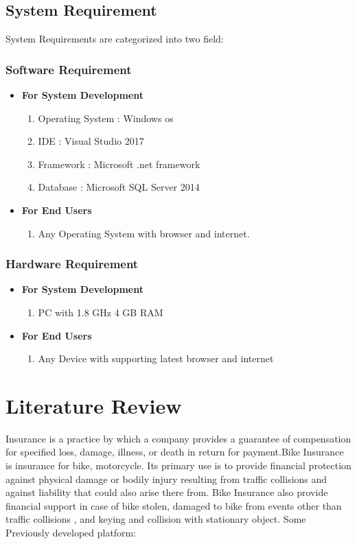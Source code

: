 \newpage
\section{System Requirement}
System Requirements are categorized  into two field:
\subsection{Software Requirement}
\begin{itemize}

\item{}\textbf{For System Development}
 \begin{enumerate}
 \item Operating System : Windows \acs{os}
 \item IDE : Visual Studio 2017
 \item Framework : Microsoft .net framework
 \item Database : Microsoft SQL Server 2014
 \end{enumerate}

\item \textbf{For End Users} 
\begin{enumerate}
\item Any Operating System with browser and internet.
\end{enumerate}

\end{itemize}

\subsection{Hardware Requirement}
\begin{itemize}
\item \textbf{For System  Development}
\begin{enumerate}
\item PC with 1.8 GHz 4 GB RAM
\end{enumerate}
\item \textbf{For End Users}
\begin{enumerate}
\item Any Device with supporting latest browser and internet
\end{enumerate}
\end{itemize}


\chapter{Literature Review}
Insurance is a practice by which a company provides a guarantee of compensation for specified loss, damage, illness, or death in return for payment.Bike Insurance is insurance for bike, motorcycle. Its primary use is to provide financial protection against physical damage or bodily injury resulting from traffic collisions and against liability that could also arise there from. Bike Insurance also provide financial support in case of bike stolen, damaged to bike from events other than traffic collisions , and keying and collision with stationary object. \cite{insurance2015bike}
Some Previously developed platform:
\par
